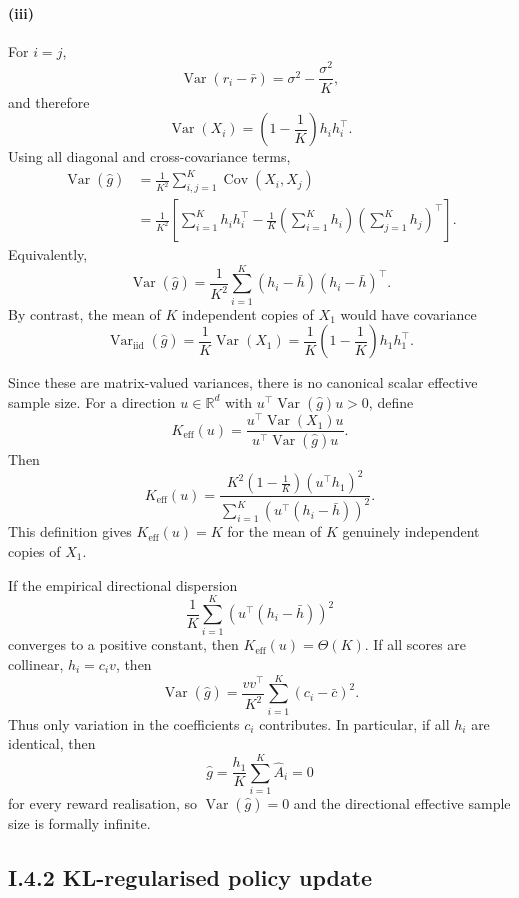 \documentclass[11pt]{article}
\begin{document}
\paragraph{(iii)}
For $i=j$,
\[
\operatorname{Var}(r_i-\bar r)
=
\sigma^2-\frac{\sigma^2}{K},
\]
and therefore
\[
\operatorname{Var}(X_i)
=
\left(1-\frac{1}{K}\right)h_i h_i^\top.
\]
Using all diagonal and cross-covariance terms,
\begin{align*}
\operatorname{Var}(\hat g)
&=
\frac{1}{K^2}
\sum_{i,j=1}^K
\operatorname{Cov}(X_i,X_j)\\
&=
\frac{1}{K^2}
\left[
\sum_{i=1}^K h_i h_i^\top
-\frac{1}{K}
\left(\sum_{i=1}^K h_i\right)
\left(\sum_{j=1}^K h_j\right)^\top
\right].
\end{align*}
Equivalently,
\[
\boxed{
\operatorname{Var}(\hat g)
=
\frac{1}{K^2}
\sum_{i=1}^K
(h_i-\bar h)(h_i-\bar h)^\top.
}
\]
By contrast, the mean of $K$ independent copies of $X_1$ would have covariance
\[
\operatorname{Var}_{\mathrm{iid}}(\hat g)
=
\frac{1}{K}\operatorname{Var}(X_1)
=
\frac{1}{K}
\left(1-\frac{1}{K}\right)h_1h_1^\top.
\]

Since these are matrix-valued variances, there is no canonical scalar effective
sample size. For a direction $u\in\mathbb{R}^d$ with
$u^\top\operatorname{Var}(\hat g)u>0$, define
\[
K_{\mathrm{eff}}(u)
=
\frac{
u^\top\operatorname{Var}(X_1)u
}{
u^\top\operatorname{Var}(\hat g)u
}.
\]
Then
\[
\boxed{
K_{\mathrm{eff}}(u)
=
\frac{
K^2\left(1-\frac{1}{K}\right)(u^\top h_1)^2
}{
\sum_{i=1}^K
\left(u^\top(h_i-\bar h)\right)^2
}.
}
\]
This definition gives $K_{\mathrm{eff}}(u)=K$ for the mean of $K$ genuinely
independent copies of $X_1$.

If the empirical directional dispersion
\[
\frac{1}{K}\sum_{i=1}^K
\left(u^\top(h_i-\bar h)\right)^2
\]
converges to a positive constant, then $K_{\mathrm{eff}}(u)=\Theta(K)$.
If all scores are collinear, $h_i=c_i v$, then
\[
\operatorname{Var}(\hat g)
=
\frac{vv^\top}{K^2}
\sum_{i=1}^K(c_i-\bar c)^2.
\]
Thus only variation in the coefficients $c_i$ contributes. In particular, if
all $h_i$ are identical, then
\[
\hat g
=
\frac{h_1}{K}\sum_{i=1}^K\hat A_i
=0
\]
for every reward realisation, so $\operatorname{Var}(\hat g)=0$ and the
directional effective sample size is formally infinite.


\subsection*{I.4.2 KL-regularised policy update}
\end{document}
